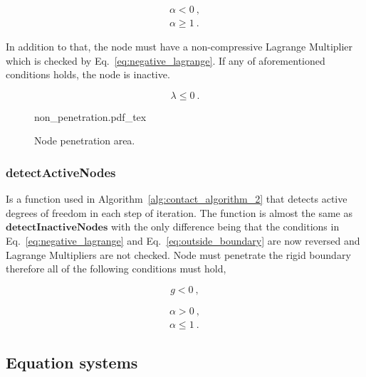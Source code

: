 \documentclass[10pt,a4paper]{article}
\begin{document}
\begin{subequations}
	\begin{alignat}{1}
		\alpha < 0  \:, \label{eq:outside_boundary_1}\\
		\alpha \geq 1  \:.\label{eq:outside_boundary_2}
	\end{alignat}
	\label{eq:outside_boundary}
\end{subequations}

In addition to that, the node must have a non-compressive Lagrange Multiplier which is checked by Eq.~\eqref{eq:negative_lagrange}. If any of aforementioned conditions holds, the node is inactive.

\begin{equation}
	\lambda \leq 0 \:.
	\label{eq:negative_lagrange}
\end{equation}

\begin{figure}[ht]
	\centering
	\footnotesize
    \def\svgwidth{0.85\textwidth}{non_penetration.pdf_tex}
	\caption{Node penetration area.}
	\label{im:non_penetration}
\end{figure}

\subsubsection{detectActiveNodes}

Is a function used in Algorithm~\ref{alg:contact_algorithm_2} that detects active degrees of freedom in each step of iteration. The function is almost the same as $\textbf{detectInactiveNodes}$ with the only difference being that the conditions in Eq.~\eqref{eq:negative_lagrange} and Eq.~\eqref{eq:outside_boundary} are now reversed and Lagrange Multipliers are not checked. Node must penetrate the rigid boundary therefore all of the following conditions must hold,

\begin{equation}
	g < 0  \:,
	\label{eq:outside_penetration}
\end{equation}

\begin{subequations}
	\begin{alignat}{1}
		\alpha > 0  \:, \label{eq:inside_boundary_1}\\
		\alpha \leq 1  \:.\label{eq:inside_boundary_2}
	\end{alignat}
	\label{eq:inside_boundary}
\end{subequations}


\subsection{Equation systems}
\end{document}
